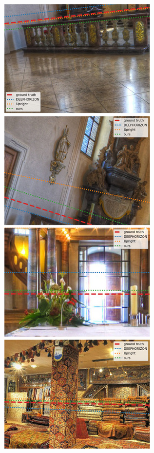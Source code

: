 \includegraphics{horizon_estimation/thumb/pano_addiyhtujpaovr-4.jpg}
\includegraphics{horizon_estimation/thumb/pano_addiyhtujpaovr-5.jpg}
\includegraphics{horizon_estimation/thumb/pano_addiyhtujpaovr-6.jpg}
\includegraphics{horizon_estimation/thumb/pano_addjhelqxestdk-0.jpg}
